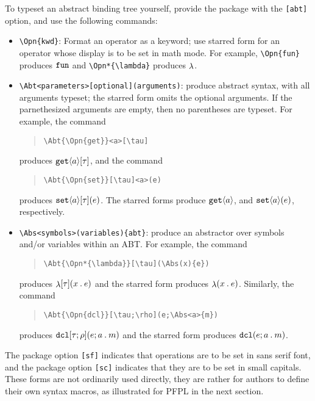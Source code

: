 \documentclass[11pt]{article}
\begin{document}
To typeset an abstract binding tree yourself, provide the package with the \verb|[abt]| option, and use the following commands:
\begin{itemize}
  \item \verb|\Opn{kwd}|: Format an operator as a keyword; use starred form for an operator whose display is to be set in math mode.  For example, \verb|\Opn{fun}| produces $\Opn{fun}$ and \verb|\Opn*{\lambda}| produces $\Opn*{\lambda}$.
  \item \verb|\Abt<parameters>[optional](arguments)|: produce abstract syntax, with all arguments typeset; the starred form omits the optional arguments.  If the parnethesized arguments are empty, then no parentheses are typeset.  For example, the command
  \begin{quote}
\begin{verbatim}
\Abt{\Opn{get}}<a>[\tau]
\end{verbatim}
  \end{quote}
  produces $\Abt{\Opn{get}}<a>[\tau]$, and the command
  \begin{quote}
\begin{verbatim}
\Abt{\Opn{set}}[\tau]<a>(e)
\end{verbatim}
  \end{quote}
  produces $\Abt{\Opn{set}}<a>[\tau](e)$.  The starred forms produce $\Abt*{\Opn{get}}<a>[\tau]$, and $\Abt*{\Opn{set}}<a>[\tau](e)$, respectively.

  \item \verb|\Abs<symbols>(variables){abt}|: produce an abstractor over symbols and/or variables within an ABT.  For example, the command
  \begin{quote}
\begin{verbatim}
\Abt{\Opn*{\lambda}}[\tau](\Abs(x){e})
\end{verbatim}
  \end{quote}
  produces $\Abt{\Opn*{\lambda}}[\tau](\Abs(x){e})$ and the starred form produces $\Abt*{\Opn*{\lambda}}[\tau](\Abs(x){e})$.  Similarly, the command
  \begin{quote}
\begin{verbatim}
\Abt{\Opn{dcl}}[\tau;\rho](e;\Abs<a>{m})
\end{verbatim}
  \end{quote}
  produces $\Abt{\Opn{dcl}}[\tau;\rho](e;\Abs<a>{m})$ and the starred form produces $\Abt*{\Opn{dcl}}[\tau\,\rho](e;\Abs<a>{m})$.
\end{itemize}

The package option \verb|[sf]| indicates that operations are to be set in sans serif font, and the package option \verb|[sc]| indicates that they are to be set in small capitals.
These forms are not ordinarily used directly, they are rather for authors to define their own syntax macros, as illustrated for \textsf{PFPL} in the next section.
\end{document}
